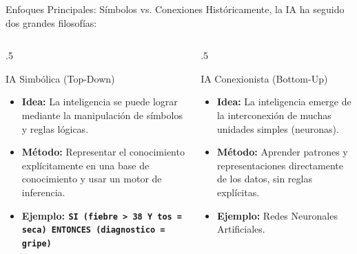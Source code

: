 \documentclass{beamer}
\begin{document}
\begin{frame}{Enfoques Principales: Símbolos vs. Conexiones}
  Históricamente, la IA ha seguido dos grandes filosofías:
  
  \begin{columns}[T]
    \begin{column}{.5\textwidth}
        \begin{block}{IA Simbólica (Top-Down)}
            \begin{itemize}
                \item \textbf{Idea:} La inteligencia se puede lograr mediante la manipulación de símbolos y reglas lógicas.
                \item \textbf{Método:} Representar el conocimiento explícitamente en una base de conocimiento y usar un motor de inferencia.
                \item \textbf{Ejemplo: %
                \texttt{SI (fiebre > 38 Y tos = seca) ENTONCES (diagnostico = gripe)} 
                }
               \end{itemize}
        \end{block}
    \end{column}
    \begin{column}{.5\textwidth}
        \begin{block}{IA Conexionista (Bottom-Up)}
            \begin{itemize}
                \item \textbf{Idea:} La inteligencia emerge de la interconexión de muchas unidades simples (neuronas).
                \item \textbf{Método:} Aprender patrones y representaciones directamente de los datos, sin reglas explícitas.
                \item \textbf{Ejemplo:} Redes Neuronales Artificiales.
            \end{itemize}
        \end{block}
    \end{column}
  \end{columns}
\end{frame}
%
\end{document}
